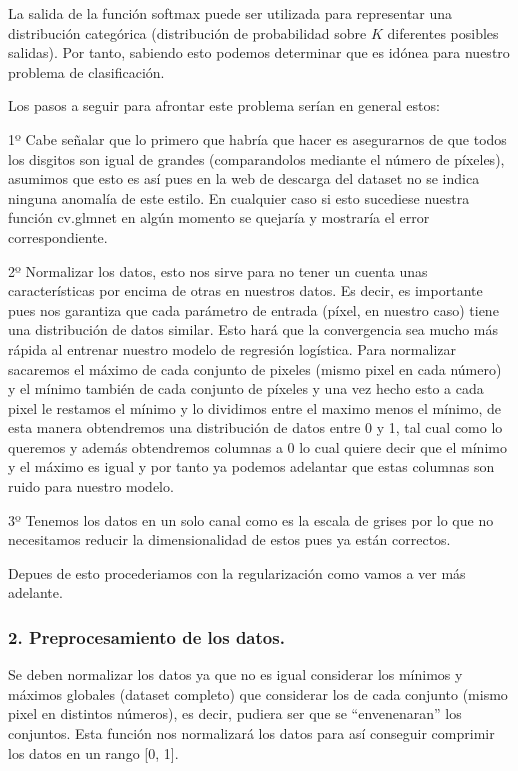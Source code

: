 \documentclass[]{article}
\begin{document}
La salida de la función softmax puede ser utilizada para representar una
distribución categórica (distribución de probabilidad sobre \(K\)
diferentes posibles salidas). Por tanto, sabiendo esto podemos
determinar que es idónea para nuestro problema de clasificación.

Los pasos a seguir para afrontar este problema serían en general estos:

1º Cabe señalar que lo primero que habría que hacer es asegurarnos de
que todos los disgitos son igual de grandes (comparandolos mediante el
número de píxeles), asumimos que esto es así pues en la web de descarga
del dataset no se indica ninguna anomalía de este estilo. En cualquier
caso si esto sucediese nuestra función cv.glmnet en algún momento se
quejaría y mostraría el error correspondiente.

2º Normalizar los datos, esto nos sirve para no tener un cuenta unas
características por encima de otras en nuestros datos. Es decir, es
importante pues nos garantiza que cada parámetro de entrada (píxel, en
nuestro caso) tiene una distribución de datos similar. Esto hará que la
convergencia sea mucho más rápida al entrenar nuestro modelo de
regresión logística. Para normalizar sacaremos el máximo de cada
conjunto de pixeles (mismo pixel en cada número) y el mínimo también de
cada conjunto de píxeles y una vez hecho esto a cada pixel le restamos
el mínimo y lo dividimos entre el maximo menos el mínimo, de esta manera
obtendremos una distribución de datos entre 0 y 1, tal cual como lo
queremos y además obtendremos columnas a 0 lo cual quiere decir que el
mínimo y el máximo es igual y por tanto ya podemos adelantar que estas
columnas son ruido para nuestro modelo.

3º Tenemos los datos en un solo canal como es la escala de grises por lo
que no necesitamos reducir la dimensionalidad de estos pues ya están
correctos.

Depues de esto procederiamos con la regularización como vamos a ver más
adelante.

\subsubsection{2. Preprocesamiento de los
datos.}\label{preprocesamiento-de-los-datos.}

Se deben normalizar los datos ya que no es igual considerar los mínimos
y máximos globales (dataset completo) que considerar los de cada
conjunto (mismo pixel en distintos números), es decir, pudiera ser que
se ``envenenaran'' los conjuntos. Esta función nos normalizará los datos
para así conseguir comprimir los datos en un rango {[}0, 1{]}.
\end{document}
